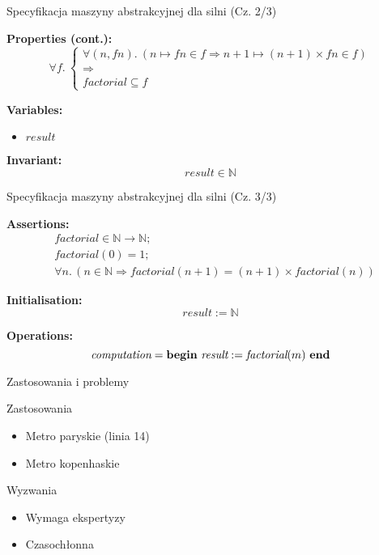\documentclass{beamer}
\begin{document}
\begin{frame}{Specyfikacja maszyny abstrakcyjnej dla silni (Cz. 2/3)}
\begin{tcolorbox}[colback=white, colframe=blue!30!black, title=Machine FACTORIAL\_MAC]
\textbf{Properties (cont.):}
\[
\forall f.\ \begin{cases}
\forall (n, fn).\ (n \mapsto fn \in f \Rightarrow n+1 \mapsto (n+1) \times fn \in f) \\
\Rightarrow \\
\textit{factorial} \subseteq f
\end{cases}
\]

\textbf{Variables:}
\begin{itemize}
    \item $\textit{result}$
\end{itemize}

\textbf{Invariant:}
\[
\textit{result} \in \mathbb{N}
\]
\end{tcolorbox}
\end{frame}

\begin{frame}{Specyfikacja maszyny abstrakcyjnej dla silni (Cz. 3/3)}
\begin{tcolorbox}[colback=white, colframe=blue!30!black, title=Machine FACTORIAL\_MAC]
\textbf{Assertions:}
\[
\begin{aligned}
& \textit{factorial} \in \mathbb{N} \rightarrow \mathbb{N}; \\
& \textit{factorial}(0) = 1; \\
& \forall n.\,(n \in \mathbb{N} \Rightarrow \textit{factorial}(n+1) = (n+1) \times \textit{factorial}(n))
\end{aligned}
\]

\textbf{Initialisation:}
\[
\textit{result} := \mathbb{N}
\]

\textbf{Operations:}
\[
\textit{computation} = \text{\textbf{begin}}\ \textit{result} := \textit{factorial}(m)\ \text{\textbf{end}}
\]
\end{tcolorbox}
\end{frame}

\begin{frame}{Zastosowania i problemy}
\begin{exampleblock}{Zastosowania}
\begin{itemize}
\item Metro paryskie (linia 14)
\item Metro kopenhaskie
\end{itemize}
\end{exampleblock}

\begin{alertblock}{Wyzwania}
\begin{itemize}
\item Wymaga ekspertyzy
\item Czasochłonna
\end{itemize}
\end{alertblock}
\end{frame}
\end{document}
